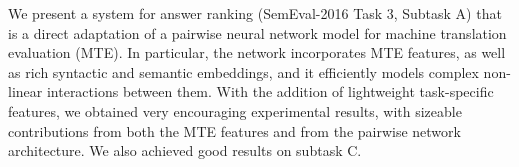 We present a system for answer ranking (SemEval-2016 Task 3, Subtask A) that is a direct adaptation of a pairwise neural network model for machine translation evaluation (MTE). In particular, the network incorporates MTE features, as well as rich syntactic and semantic embeddings, and it efficiently models complex non-linear interactions between them. With the addition of lightweight task-specific features, we obtained very encouraging experimental results, with sizeable contributions from both the MTE features and from the pairwise network architecture. We also achieved good results on subtask C.
